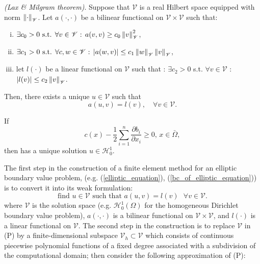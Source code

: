 \begin{thm}
	\label{lax_milgram_lemma}
	\textit{(Lax \& Milgram theorem)}. Suppose that $\mathscr{V}$ is a real Hilbert space equipped with norm $\left\lVert\cdot\right\rVert_{\mathscr{V}}$. Let $a(\cdot, \cdot)$ be a bilinear functional on $\mathscr{V}\times\mathscr{V}$ such that:
	\begin{enumerate} [i.]
		\item $\exists c_0 > 0 \text{ s.t. } \forall v \in \mathscr{V}\text{ : }a(v, v)\geq c_0 \left\lVert v\right\rVert_{\mathscr{V}}^{2}$,
		\item $\exists c_1 > 0 \text{ s.t. } \forall c,w \in \mathscr{V}\text{ : } \vert a(w, v)\vert \leq c_1 \left\lVert w\right\rVert_{\mathscr{V}}\left\lVert v\right\rVert_{\mathscr{V}}$, 
		\item let $l(\cdot)$ be a linear functional on $\mathscr{V}$ such that : $\exists c_2 > 0$ s.t. $\forall v\in \mathscr{V}$ : $\vert l(v)\vert\leq c_2 \left\lVert v\right\rVert_{\mathscr{V}}$.
	\end{enumerate}
	Then, there exists a unique $u \in \mathscr{V}$ such that 
	\begin{equation*}
			a(u, v) = l(v), \quad \forall v \in \mathscr{V}.
	\end{equation*}
\end{thm}
\begin{remark}
	If
	\begin{equation*}
		c(x) - \frac{1}{2} \sum_{i=1}^{n} \frac{\partial b_i}{\partial x_i} \geq 0 \text{,     }x\in \bar{\Omega},
	\end{equation*}
	then has a unique solution $u\in\mathscr{H}_{0}^{1}$.
\end{remark}
The first step in the construction of a finite element method for an elliptic boundary value problem, (e.g. (\ref{elliptic_equation}), (\ref{bc_of_elliptic_equation})) is to convert it into its weak formulation:
\begin{equation*}
	\text{find } u \in \mathscr{V}\text{ such that }a(u, v) = l(v)\text{ }\forall v \in \mathscr{V}.  \tag{P}
\end{equation*}
where $\mathscr{V}$ is the solution space (e.g. $\mathscr{H}_{0}^{1}(\Omega)$ for the homogeneous Dirichlet boundary value problem), $a(\cdot, \cdot)$ is a bilinear functional on $\mathscr{V}\times\mathscr{V}$, and $l(\cdot)$ is a linear functional on $\mathscr{V}$.
The second step in the construction is to replace $\mathscr{V}$ in (P) by a finite-dimensional subspace $\mathscr{V}_h \subset \mathscr{V}$ which consists of continuous piecewise polynomial functions of a fixed degree associated with a subdivision of the computational domain; then consider the following approximation of (P):
